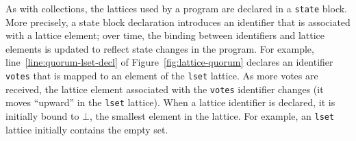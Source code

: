 As with collections, the lattices used by a \lang program are declared in a
\texttt{state} block. More precisely, a state block declaration introduces an
identifier that is associated with a lattice element; over time, the binding
between identifiers and lattice elements is updated to reflect state changes in
the program. For example, line~\ref{line:quorum-lset-decl} of
Figure~\ref{fig:lattice-quorum} declares an identifier \texttt{votes} that is
mapped to an element of the \texttt{lset} lattice. As more votes are received,
the lattice element associated with the \texttt{votes} identifier changes (it
moves ``upward'' in the \texttt{lset} lattice). When a lattice identifier is
declared, it is initially bound to $\bot$, the smallest element in the
lattice. For example, an \texttt{lset} lattice initially contains the empty set.

